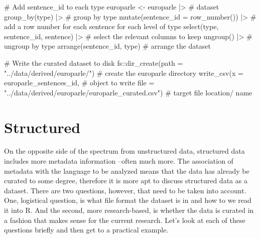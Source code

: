 \documentclass[
  letterpaper,
]{latex/krantz}
\newenvironment{Shaded}{\begin{snugshade}}{\end{snugshade}}
\newcommand{\AttributeTok}[1]{\textcolor[rgb]{0.40,0.45,0.13}{#1}}
\newcommand{\CommentTok}[1]{\textcolor[rgb]{0.37,0.37,0.37}{#1}}
\newcommand{\FunctionTok}[1]{\textcolor[rgb]{0.28,0.35,0.67}{#1}}
\newcommand{\NormalTok}[1]{\textcolor[rgb]{0.00,0.23,0.31}{#1}}
\newcommand{\OtherTok}[1]{\textcolor[rgb]{0.00,0.23,0.31}{#1}}
\newcommand{\SpecialCharTok}[1]{\textcolor[rgb]{0.37,0.37,0.37}{#1}}
\newcommand{\StringTok}[1]{\textcolor[rgb]{0.13,0.47,0.30}{#1}}
\begin{document}
\begin{Shaded}
\begin{Highlighting}[]
\CommentTok{\# Add \textasciigrave{}sentence\_id\textasciigrave{} to each \textasciigrave{}type\textasciigrave{}}
\NormalTok{europarle }\OtherTok{\textless{}{-}} 
\NormalTok{  europarle }\SpecialCharTok{|\textgreater{}} \CommentTok{\# dataset}
  \FunctionTok{group\_by}\NormalTok{(type) }\SpecialCharTok{|\textgreater{}} \CommentTok{\# group by type}
  \FunctionTok{mutate}\NormalTok{(}\AttributeTok{sentence\_id =} \FunctionTok{row\_number}\NormalTok{()) }\SpecialCharTok{|\textgreater{}} \CommentTok{\# add a row number for each sentence for each level of type}
  \FunctionTok{select}\NormalTok{(type, sentence\_id, sentence) }\SpecialCharTok{|\textgreater{}} \CommentTok{\# select the relevant columns to keep}
  \FunctionTok{ungroup}\NormalTok{() }\SpecialCharTok{|\textgreater{}}  \CommentTok{\# ungroup by type}
  \FunctionTok{arrange}\NormalTok{(sentence\_id, type) }\CommentTok{\# arrange the dataset}

\CommentTok{\# Write the curated dataset to disk}
\NormalTok{fs}\SpecialCharTok{::}\FunctionTok{dir\_create}\NormalTok{(}\AttributeTok{path =} \StringTok{"../data/derived/europarle/"}\NormalTok{) }\CommentTok{\# create the europarle directory}
\FunctionTok{write\_csv}\NormalTok{(}\AttributeTok{x =}\NormalTok{ europarle\_sentences\_id, }\CommentTok{\# object to write}
          \AttributeTok{file =} \StringTok{"../data/derived/europarle/europarle\_curated.csv"}\NormalTok{) }\CommentTok{\# target file location/ name}
\end{Highlighting}
\end{Shaded}

\hypertarget{structured}{%
\section{Structured}\label{structured}}

On the opposite side of the spectrum from unstructured data, structured
data includes more metadata information --often much more. The
association of metadata with the language to be analyzed means that the
data has already be curated to some degree, therefore it is more apt to
discuss structured data as a dataset. There are two questions, however,
that need to be taken into account. One, logistical question, is what
file format the dataset is in and how to we read it into R. And the
second, more research-based, is whether the data is curated in a fashion
that makes sense for the current research. Let's look at each of these
questions briefly and then get to a practical example.
\end{document}
